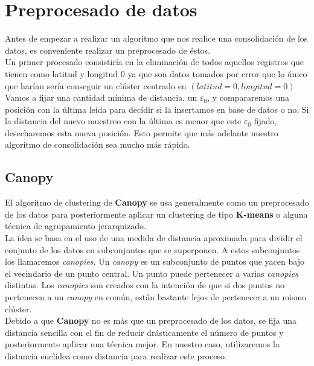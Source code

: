 \documentclass[a4paper, 12pt]{article}
\begin{document}
\pagebreak
\section{Preprocesado de datos}
Antes de empezar a realizar un algoritmo que nos realice una consolidaci\'on de los datos, es conveniente realizar un preprocesado de \'estos. \\

Un primer procesado consistir\'ia en la eliminaci\'on de todos aquellos registros que tienen como latitud y longitud $0$ ya que son datos tomados por error que lo \'unico que har\'ian ser\'ia conseguir un cl\'uster centrado en $(latitud = 0, longitud = 0)$ \\

Vamos a fijar una cantidad m\'inima de distancia, un $\varepsilon_0$, y compararemos una posici\'on con la \'ultima le\'ida para decidir si la insertamos en base de datos o no. Si la distancia del nuevo muestreo con la \'ultima es menor que este $\varepsilon_0$ fijado, desecharemos esta nueva posici\'on. Esto permite que m\'as adelante nuestro algoritmo de consolidaci\'on sea mucho m\'as r\'apido. \\


\subsection{Canopy}\label{sec:canopy}

El algoritmo de clustering de \textbf{Canopy}\cite{canopy} se usa generalmente como un preprocesado de los datos para posteriormente aplicar un clustering de tipo \textbf{K-means} o alguna t\'ecnica de agrupamiento jerarquizado.\\

La idea se basa en el uso de una medida de distancia aproximada para dividir el conjunto de los datos en subconjuntos que se superponen. A estos subconjuntos los llamaremos \textit{canopies}. Un \textit{canopy} es un subconjunto de puntos que yacen bajo el vecindario de un punto central. Un punto puede pertenecer a varias \textit{canopies} distintas. Los \textit{canopies} son creados con la intenci\'on de que si dos puntos no pertenecen a un \textit{canopy} en com\'un, est\'an bastante lejos de pertenecer a un mismo cl\'uster. \\

Debido a que \textbf{Canopy} no es m\'as que un preprocesado de los datos, se fija una distancia sencilla con el fin de reducir dr\'asticamente el n\'umero de puntos y posteriormente aplicar una t\'ecnica mejor. En nuestro caso, utilizaremos la distancia eucl\'idea como distancia para realizar este proceso. \\
\end{document}
